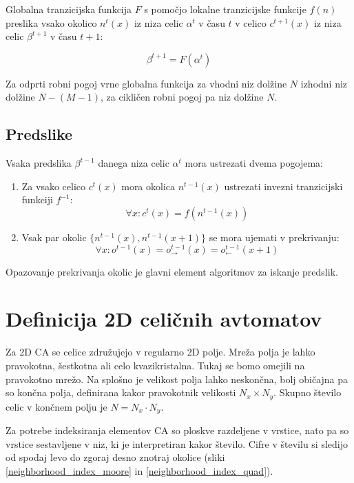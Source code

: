 \documentclass[12pt,a4paper,openany,twoside]{book}
\begin{document}
Globalna tranzicijska funkcija \(F\) s pomočjo lokalne tranzicijske funkcije \(f(n)\)
preslika vsako okolico \(n^t(x)\) iz niza celic \(\alpha^t\) v času \(t\)
v celico \(c^{t+1}(x)\) iz niza celic \(\beta^{t+1}\) v času \(t+1\):

\begin{equation}
\beta^{t+1} = F (\alpha^t)
\end{equation}

Za odprti robni pogoj vrne globalna funkcija za vhodni niz dolžine \(N\)
izhodni niz dolžine \(N-(M-1)\), za cikličen robni pogoj pa niz dolžine \(N\).

\subsection{Predslike}

Vsaka predslika \(\beta^{t-1}\) danega niza celic \(\alpha^t\) mora ustrezati dvema pogojema:
\begin{enumerate}
\item Za vsako celico \(c^{t}(x)\) mora okolica \(n^{t-1}(x)\) ustrezati invezni tranzicijski funkciji \(f^{-1}\):
\begin{equation}
\forall x : c^{t}(x) = f(n^{t-1}(x))
\end{equation}
\item Vsak par okolic \(\{n^{t-1}(x), n^{t-1}(x+1)\}\) se mora ujemati v prekrivanju:
\begin{equation}
\forall x : o^{t-1}(x) = o_{\rightarrow}^{t-1}(x) = o_{\leftarrow}^{t-1}(x+1)
\end{equation}
\end{enumerate}
Opazovanje prekrivanja okolic je glavni element algoritmov za iskanje predslik.

\section{Definicija 2D celičnih avtomatov}

Za 2D CA se celice združujejo v regularno 2D polje.
Mreža polja je lahko pravokotna, šestkotna ali celo kvazikristalna.
Tukaj se bomo omejili na pravokotno mrežo.
Na splošno je velikost polja lahko neskončna,
bolj običajna pa so končna polja,
definirana kakor pravokotnik velikosti \(N_x \times N_y\).
Skupno število celic v končnem polju je \(N=N_x \cdot N_y\).

Za potrebe indeksiranja elementov CA so ploskve razdeljene v vrstice,
nato pa so vrstice sestavljene v niz, ki je interpretiran kakor število.
Cifre v številu si sledijo od spodaj levo do zgoraj desno znotraj okolice
(sliki \ref{neighborhood_index_moore} in \ref{neighborhood_index_quad}).
\end{document}
